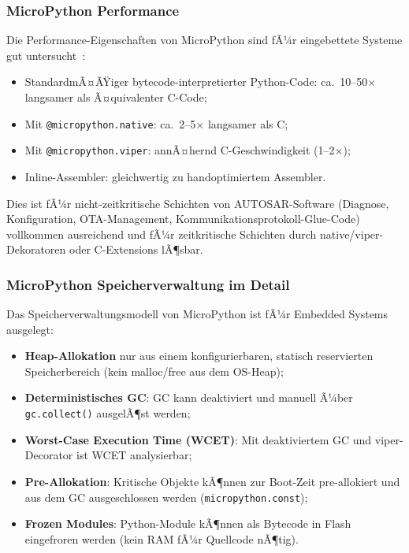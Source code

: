 ﻿\documentclass[12pt,a4paper,twoside]{article}
\begin{document}
\subsubsection{MicroPython Performance}
Die Performance-Eigenschaften von MicroPython sind fÃ¼r eingebettete Systeme
gut untersucht~\cite{micropython_perf_papanastasiou2021, python_embedded_benchmark2022}:

\begin{itemize}
  \item StandardmÃ¤ÃŸiger bytecode-interpretierter Python-Code:
        ca.\ 10--50$\times$ langsamer als Ã¤quivalenter C-Code;
  \item Mit \texttt{@micropython.native}: ca.\ 2--5$\times$ langsamer als C;
  \item Mit \texttt{@micropython.viper}: annÃ¤hernd C-Geschwindigkeit (1--2$\times$);
  \item Inline-Assembler: gleichwertig zu handoptimiertem Assembler.
\end{itemize}

Dies ist fÃ¼r nicht-zeitkritische Schichten von AUTOSAR-Software
(Diagnose, Konfiguration, OTA-Management, Kommunikationsprotokoll-Glue-Code)
vollkommen ausreichend und fÃ¼r zeitkritische Schichten durch
native/viper-Dekoratoren oder C-Extensions lÃ¶sbar.

\subsubsection{MicroPython Speicherverwaltung im Detail}
\label{subsubsec:gc}

Das Speicherverwaltungsmodell von MicroPython ist fÃ¼r Embedded Systems ausgelegt:

\begin{itemize}
  \item \textbf{Heap-Allokation} nur aus einem konfigurierbaren, statisch reservierten
        Speicherbereich (kein malloc/free aus dem OS-Heap);
  \item \textbf{Deterministisches GC}: GC kann deaktiviert und manuell Ã¼ber
        \texttt{gc.collect()} ausgelÃ¶st werden;
  \item \textbf{Worst-Case Execution Time (WCET)}: Mit deaktiviertem GC und
        viper-Decorator ist WCET analysierbar;
  \item \textbf{Pre-Allokation}: Kritische Objekte kÃ¶nnen zur Boot-Zeit
        pre-allokiert und aus dem GC ausgeschlossen werden (\texttt{micropython.const});
  \item \textbf{Frozen Modules}: Python-Module kÃ¶nnen als Bytecode in Flash
        eingefroren werden (kein RAM fÃ¼r Quellcode nÃ¶tig).
\end{itemize}
\end{document}
